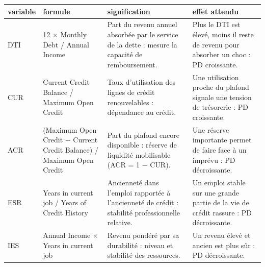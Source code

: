 \begin{tabular}{lp{3.6cm}p{5cm}p{5cm}}
\toprule
\textbf{variable} & \textbf{formule} & \textbf{signification} & \textbf{effet attendu} \\
\midrule
DTI & 12 $\times$ Monthly Debt / Annual Income & Part du revenu annuel absorbée par le service de la dette : mesure la capacité de remboursement. & Plus le DTI est élevé, moins il reste de revenu pour absorber un choc : PD croissante. \\
CUR & Current Credit Balance / Maximum Open Credit & Taux d'utilisation des lignes de crédit renouvelables : dépendance au crédit. & Une utilisation proche du plafond signale une tension de trésorerie : PD croissante. \\
ACR & (Maximum Open Credit $-$ Current Credit Balance) / Maximum Open Credit & Part du plafond encore disponible : réserve de liquidité mobilisable (ACR = 1 $-$ CUR). & Une réserve importante permet de faire face à un imprévu : PD décroissante. \\
ESR & Years in current job / Years of Credit History & Ancienneté dans l'emploi rapportée à l'ancienneté de crédit : stabilité professionnelle relative. & Un emploi stable sur une grande partie de la vie de crédit rassure : PD décroissante. \\
IES & Annual Income $\times$ Years in current job & Revenu pondéré par sa durabilité : niveau et stabilité des ressources. & Un revenu élevé et ancien est plus sûr : PD décroissante. \\
\bottomrule
\end{tabular}
